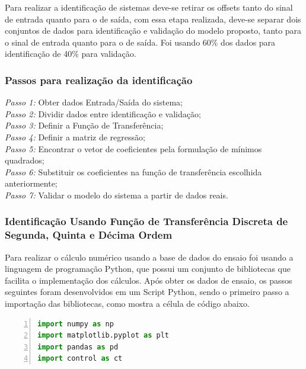 Para realizar a identificação de sistemas deve-se retirar os offsets tanto do sinal de entrada quanto para o de saída, com essa etapa realizada, deve-se separar dois conjuntos de dados para identificação e validação do modelo proposto, tanto para o sinal de entrada quanto para o de saída. Foi usando 60\% dos dados para identificação de 40\% para validação.

\subsubsection{Passos para realização da identificação}


\noindent\textit{Passo 1:} Obter dados Entrada/Saída do sistema;\\
\textit{Passo 2:} Dividir dados entre identificação e validação;\\
\textit{Passo 3:} Definir a Função de Transferência;\\
\textit{Passo 4:} Definir a matriz de regressão;\\
\textit{Passo 5:} Encontrar o vetor de coeficientes pela formulação de mínimos quadrados;\\
\textit{Passo 6:} Substituir os coeficientes na função de transferência escolhida anteriormente;\\
\textit{Passo 7:} Validar o modelo do sistema a partir de dados reais.\\


\subsubsection{Identificação Usando Função de Transferência Discreta de Segunda, Quinta e Décima Ordem}

Para realizar o cálculo numérico usando a base de dados do ensaio foi usando a linguagem de programação Python, que possui um conjunto de bibliotecas que facilita o implementação dos cálculos. Após obter os dados de ensaio, os passos seguintes foram desenvolvidos em um Script Python, sendo o primeiro passo a importação das bibliotecas, como mostra a célula de código abaixo.

\vspace{0.5cm}

\begin{lstlisting}[language=python, numbers=left, label=py3, caption={Importação das Bibliotecas usadas para identificação de sistemas.}]
import numpy as np 
import matplotlib.pyplot as plt
import pandas as pd
import control as ct
\end{lstlisting}

